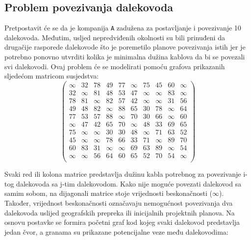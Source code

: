 \documentclass[conference]{IEEEtran}
\begin{document}
\subsection{Problem povezivanja dalekovoda}

Pretpostavit će se da je kompanija \texttt{A} \text zadužena za postavljanje i povezivanje 10 dalekovoda. Međutim, usljed nepredviđenih okolnosti su bili prinuđeni da drugačije rasporede dalekovode što je poremetilo planove povezivanja istih jer je potrebno ponovno utvrditi kolika je minimalna dužina kablova da bi se povezali svi dalekovodi.
Ovaj problem će se modelirati pomoću grafova prikazanih sljedećom matricom susjedstva:
\[
\begin{pmatrix}
\infty & 32 & 78 & 49 & 77 & \infty & 75 & 45 & 60 & \infty \\
32 & \infty & 81 & 48 & 53 & 47 & \infty & \infty & 83 & \infty \\
78 & 81 & \infty & 82 & 57 & 42 & \infty & \infty & 31 & 56 \\
49 & 48 & 82 & \infty & 88 & 65 & 30 & 78 & \infty & 64 \\
77 & 53 & 57 & 88 & \infty & 70 & 30 & 66 & \infty & 60 \\
\infty & 47 & 42 & 65 & 70 & \infty & 48 & 33 & 69 & 65 \\
75 & \infty & \infty & 30 & 30 & 48 & \infty & 71 & 63 & 52 \\
45 & \infty & \infty & 78 & 66 & 33 & 71 & \infty & 89 & 70 \\
60 & 83 & 31 & \infty & \infty & 69 & 63 & 89 & \infty & 54 \\
\infty & \infty & 56 & 64 & 60 & 65 & 52 & 70 & 54 & \infty \\
\end{pmatrix}
\]

Svaki red ili kolona matrice predstavlja dužinu kabla potrebnog za povezivanje i-tog dalekovoda sa j-tim dalekovodom. Kako nije moguće povezati dalekovod sa samim sobom, na dijagonali matrice stoje vrijednosti beskonačnosti ($\infty$). Također, vrijednost beskonačnosti označavaju nemogućnost povezivanja dva dalekovoda uslijed geografskih prepreka ili inicijalnih projektnih planova.
Na osnovu postavke se formira početni graf kod kojeg svaki dalekovod predstavlja jedan čvor, a granama su prikazane potencijalne veze među dalekovodima:
\end{document}
